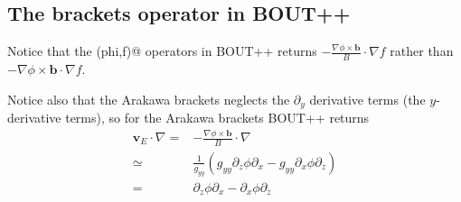 \documentclass[12pt]{article}
\def\L{\left}
\def\R{\right}
\newcommand{\ve}[1]{\ensuremath{\boldsymbol{#1}}}
\begin{document}
\subsection{The brackets operator in BOUT++}
%
Notice that the \verb@brackets(phi,f)@ operators in BOUT++ returns 
$-\frac{\nabla\phi\times\ve{b}}{B}\cdot\nabla f$ rather than 
$-\nabla\phi\times\ve{b}\cdot\nabla f$.

Notice also that the Arakawa brackets neglects the $\partial_y$ derivative 
terms (the $y$-derivative terms), so for the Arakawa brackets BOUT++ returns
%
\begin{align*}
    \ve{v}_E\cdot\nabla
    =& -\frac{\nabla\phi\times\ve{b}}{B}\cdot\nabla\\
    \simeq& \frac{1}{g_{yy}}
	       \L(
	         g_{yy}\partial_z\phi\partial_x- g_{yy}\partial_x\phi\partial_z
	       \R)\\
    =& \partial_z\phi\partial_x - \partial_x\phi\partial_z
\end{align*}
%
\end{document}
